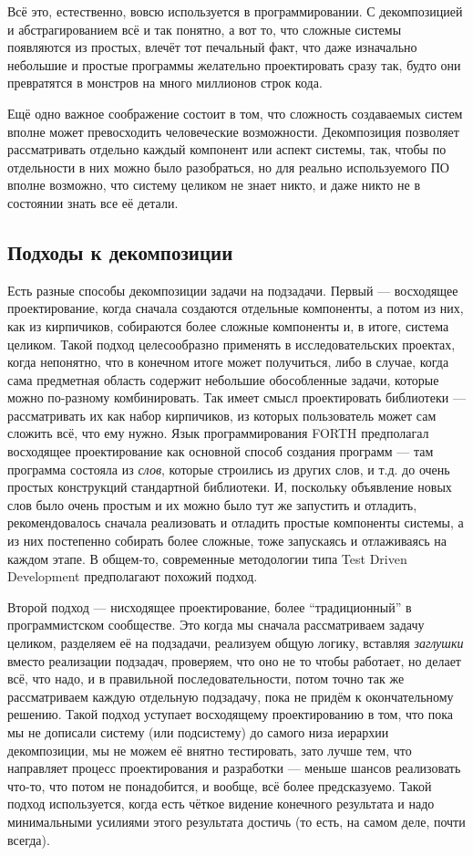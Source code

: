 \documentclass{../../text-style}
\begin{document}
Всё это, естественно, вовсю используется в программировании. С декомпозицией и абстрагированием всё и так понятно, а вот то, что сложные системы появляются из простых, влечёт тот печальный факт, что даже изначально небольшие и простые программы желательно проектировать сразу так, будто они превратятся в монстров на много миллионов строк кода.

Ещё одно важное соображение состоит в том, что сложность создаваемых систем вполне может превосходить человеческие возможности. Декомпозиция позволяет рассматривать отдельно каждый компонент или аспект системы, так, чтобы по отдельности в них можно было разобраться, но для реально используемого ПО вполне возможно, что систему целиком не знает никто, и даже никто не в состоянии знать все её детали.

\subsection{Подходы к декомпозиции}

Есть разные способы декомпозиции задачи на подзадачи. Первый --- восходящее проектирование, когда сначала создаются отдельные компоненты, а потом из них, как из кирпичиков, собираются более сложные компоненты и, в итоге, система целиком. Такой подход целесообразно применять в исследовательских проектах, когда непонятно, что в конечном итоге может получиться, либо в случае, когда сама предметная область содержит небольшие обособленные задачи, которые можно по-разному комбинировать. Так имеет смысл проектировать библиотеки --- рассматривать их как набор кирпичиков, из которых пользователь может сам сложить всё, что ему нужно. Язык программирования FORTH предполагал восходящее проектирование как основной способ создания программ --- там программа состояла из \textit{слов}, которые строились из других слов, и т.д. до очень простых конструкций стандартной библиотеки. И, поскольку объявление новых слов было очень простым и их можно было тут же запустить и отладить, рекомендовалось сначала реализовать и отладить простые компоненты системы, а из них постепенно собирать более сложные, тоже запускаясь и отлаживаясь на каждом этапе. В общем-то, современные методологии типа Test Driven Development предполагают похожий подход.

Второй подход --- нисходящее проектирование, более ``традиционный'' в программистском сообществе. Это когда мы сначала рассматриваем задачу целиком, разделяем её на подзадачи, реализуем общую логику, вставляя \textit{заглушки} вместо реализации подзадач, проверяем, что оно не то чтобы работает, но делает всё, что надо, и в правильной последовательности, потом точно так же рассматриваем каждую отдельную подзадачу, пока не придём к окончательному решению. Такой подход уступает восходящему проектированию в том, что пока мы не дописали систему (или подсистему) до самого низа иерархии декомпозиции, мы не можем её внятно тестировать, зато лучше тем, что направляет процесс проектирования и разработки --- меньше шансов реализовать что-то, что потом не понадобится, и вообще, всё более предсказуемо. Такой подход используется, когда есть чёткое видение конечного результата и надо минимальными усилиями этого результата достичь (то есть, на самом деле, почти всегда).
\end{document}
